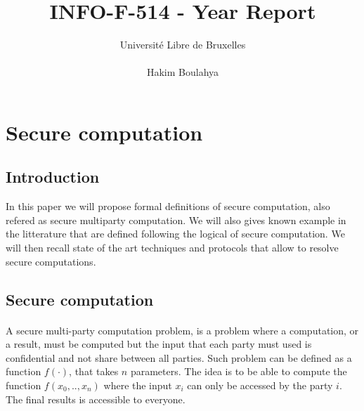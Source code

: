 \documentclass[11pt,a4paper]{article}
\title{INFO-F-514 - Year Report}
\author{Université Libre de Bruxelles \\
\\ Hakim Boulahya}
\begin{document}
\maketitle
\tableofcontents

\newpage


\section{Secure computation}

\subsection{Introduction}

In this paper we will propose formal definitions of secure
computation, also refered as secure multiparty computation.
We will also gives known example in the litterature
that are defined following the logical of secure computation.
We will then recall
state of the art techniques and protocols that allow
to resolve secure computations.

\subsection{Secure computation}

\paragraph{}

A secure multi-party computation problem, is a problem where a computation,
or a result, must be computed but the input that each party must used
is confidential and not share between all parties. Such problem
can be defined as a function $f(\cdot)$, that takes $n$ parameters.
The idea is to be able to compute the function $f(x_0, .., x_n)$
where the input $x_i$ can only be accessed by the party $i$.
The final results is accessible to everyone.

\paragraph{}
\end{document}
